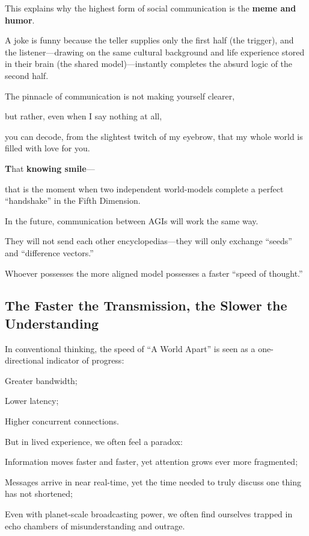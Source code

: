 \vspace{1em}

This explains why the highest form of social communication is the \textbf{meme and humor}.

A joke is funny because the teller supplies only the first half (the trigger), and the listener---drawing on the same cultural background and life experience stored in their brain (the shared model)---instantly completes the absurd logic of the second half.

\vspace{1em}
The pinnacle of communication is not making yourself clearer,

but rather, even when I say nothing at all,

you can decode, from the slightest twitch of my eyebrow, that my whole world is filled with love for you.

\vspace{1em}

\textbf{T}hat \textbf{knowing smile}---

that is the moment when two independent world-models complete a perfect ``handshake'' in the Fifth Dimension.

In the future, communication between AGIs will work the same way.

They will not send each other encyclopedias---they will only exchange ``seeds'' and ``difference vectors.''

Whoever possesses the more aligned model possesses a faster ``speed of thought.''

\subsection{The Faster the Transmission, the Slower the Understanding}

In conventional thinking, the speed of ``A World Apart'' is seen as a one-directional indicator of progress:

{\kaiti
Greater bandwidth;

Lower latency;

Higher concurrent connections.
}

\vspace{1em}

But in lived experience, we often feel a paradox:

{\kaiti
Information moves faster and faster, yet attention grows ever more fragmented;

Messages arrive in near real-time, yet the time needed to truly discuss one thing has not shortened;

Even with planet-scale broadcasting power, we often find ourselves trapped in echo chambers of misunderstanding and outrage.
}


